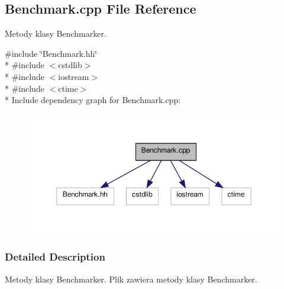 \hypertarget{a00001}{\subsection{Benchmark.\-cpp File Reference}
\label{a00001}
}


Metody klasy Benchmarker.  


{\ttfamily \#include \char`\"{}Benchmark.\-hh\char`\"{}}\\*
{\ttfamily \#include $<$cstdlib$>$}\\*
{\ttfamily \#include $<$iostream$>$}\\*
{\ttfamily \#include $<$ctime$>$}\\*
Include dependency graph for Benchmark.\-cpp\-:
\nopagebreak
\begin{figure}[H]
\begin{center}
\leavevmode
\includegraphics[width=350pt]{a00005}
\end{center}
\end{figure}


\subsubsection{Detailed Description}
Metody klasy Benchmarker. Plik zawiera metody klasy Benchmarker. 